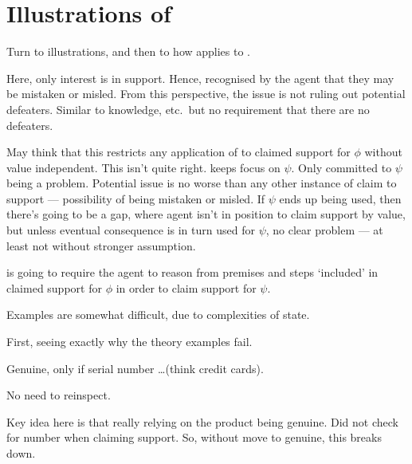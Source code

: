 \section{Illustrations of \nI{}}
\label{sec:illustrations-ni}

\begin{note}
  Turn to illustrations, and then to how \nI{} applies to \gsi{}.
\end{note}

\begin{note}
  Here, only interest is in support.
  Hence, recognised by the agent that they may be mistaken or misled.
  From this perspective, the issue is not ruling out potential defeaters.
  Similar to knowledge, etc.\ but no requirement that there are no defeaters.
\end{note}

\begin{note}
  May think that this restricts any application of \RBV{} to claimed support for \(\phi\) without value independent.
  This isn't quite right.
  \eiS{} keeps focus on \(\psi\).
  Only committed to \(\psi\) being a problem.
  Potential issue is no worse than any other instance of claim to support --- possibility of being mistaken or misled.
  If \(\psi\) ends up being used, then there's going to be a gap, where agent isn't in position to claim support by value, but unless eventual consequence is in turn used for \(\psi\), no clear problem --- at least not without stronger assumption.
\end{note}

\begin{note}
  \ESU{} is going to require the agent to reason from premises and steps `included' in claimed support for \(\phi\) in order to claim support for \(\psi\).
\end{note}

\begin{note}[Examples]
  Examples are somewhat difficult, due to complexities of state.
\end{note}

\begin{note}
  First, seeing exactly why the theory examples fail.
\end{note}

\begin{note}
  \begin{illustration}
    \label{illu:number-check}
    Genuine, only if serial number \dots (think credit cards).
  \end{illustration}
  No need to reinspect.

  Key idea here is that really relying on the product being genuine.
  Did not check for number when claiming support.
  So, without move to genuine, this breaks down.
\end{note}


